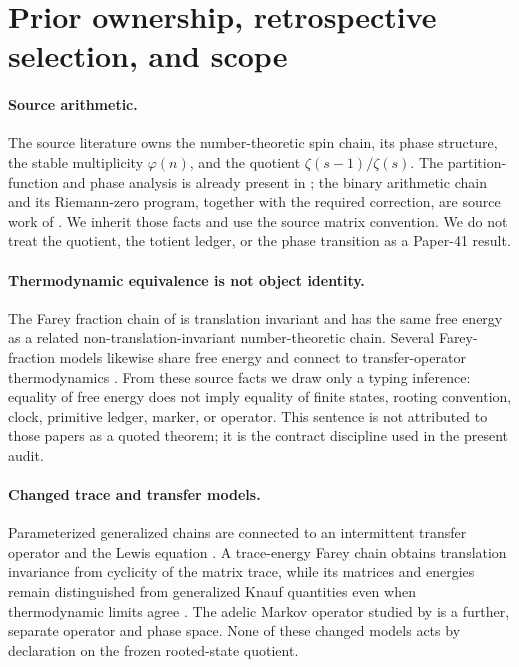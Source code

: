 \section{Prior ownership, retrospective selection, and scope}
\label{sec:prior-scope}

\paragraph{Source arithmetic.}
The source literature owns the number-theoretic spin chain, its phase
structure, the stable multiplicity $\varphi(n)$, and the quotient
$\zeta(s-1)/\zeta(s)$.  The partition-function and phase analysis is already
present in \citet{knauf1993phases}; the binary arithmetic chain and its
Riemann-zero program, together with the required correction, are source work
of \citet{knauf1998spin,knauf1999erratum}.  We inherit those facts and use the
source matrix convention.  We do not treat the quotient, the totient ledger,
or the phase transition as a Paper-41 result.

\paragraph{Thermodynamic equivalence is not object identity.}
The Farey fraction chain of \citet{klebanOzluk1999farey} is translation
invariant and has the same free energy as a related non-translation-invariant
number-theoretic chain.  Several Farey-fraction models likewise share free
energy and connect to transfer-operator thermodynamics
\citep{fiala2003phase}.  From these source facts we draw only a typing
inference: equality of free energy does not imply equality of finite states,
rooting convention, clock, primitive ledger, marker, or operator.  This
sentence is not attributed to those papers as a quoted theorem; it is the
contract discipline used in the present audit.

\paragraph{Changed trace and transfer models.}
Parameterized generalized chains are connected to an intermittent transfer
operator and the Lewis equation \citep{fialaKleban2005generalized}.  A
trace-energy Farey chain obtains translation invariance from cyclicity of the
matrix trace, while its matrices and energies remain distinguished from
generalized Knauf quantities even when thermodynamic limits agree
\citep{prellbergFialaKleban2006cluster}.  The adelic Markov operator studied
by \citet{knauf2013adelic} is a further, separate operator and phase space.
None of these changed models acts by declaration on the frozen rooted-state
quotient.

